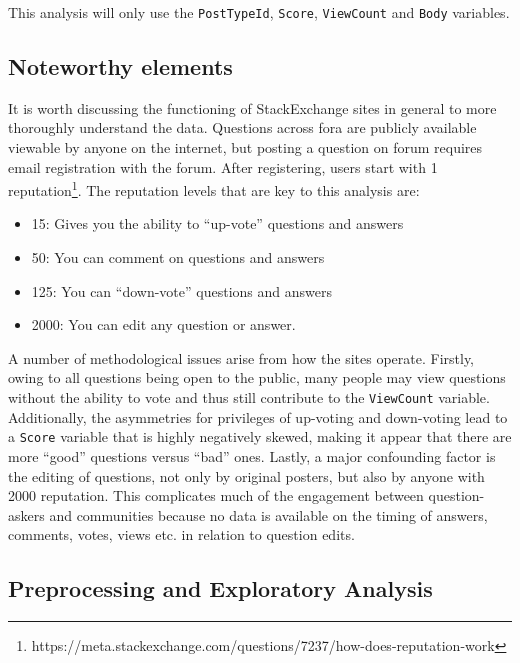 \documentclass[12pt,preprint, authoryear]{article}
\numberwithin{equation}{section}
\numberwithin{figure}{section}
\numberwithin{table}{section}
\let\rmarkdownfootnote\footnote%
\def\footnote{\protect\rmarkdownfootnote}
\begin{document}

This analysis will only use the \texttt{PostTypeId}, \texttt{Score},
\texttt{ViewCount} and \texttt{Body} variables.

\subsection{\texorpdfstring{Noteworthy elements
\label{noteworthy}}{Noteworthy elements }}\label{noteworthy-elements}

It is worth discussing the functioning of StackExchange sites in general
to more thoroughly understand the data. Questions across fora are
publicly available viewable by anyone on the internet, but posting a
question on forum requires email registration with the forum. After
registering, users start with 1
reputation\footnote{https://meta.stackexchange.com/questions/7237/how-does-reputation-work}.
The reputation levels that are key to this analysis are:


\begin{itemize}
\item
  15: Gives you the ability to ``up-vote'' questions and answers
\item
  50: You can comment on questions and answers
\item
  125: You can ``down-vote'' questions and answers
\item
  2000: You can edit any question or answer.
\end{itemize}


A number of methodological issues arise from how the sites operate.
Firstly, owing to all questions being open to the public, many people
may view questions without the ability to vote and thus still contribute
to the \texttt{ViewCount} variable. Additionally, the asymmetries for
privileges of up-voting and down-voting lead to a \texttt{Score}
variable that is highly negatively skewed, making it appear that there
are more ``good'' questions versus ``bad'' ones. Lastly, a major
confounding factor is the editing of questions, not only by original
posters, but also by anyone with 2000 reputation. This complicates much
of the engagement between question-askers and communities because no
data is available on the timing of answers, comments, votes, views etc.
in relation to question edits.

\subsection{Preprocessing and Exploratory
Analysis}\label{preprocessing-and-exploratory-analysis}
\end{document}
